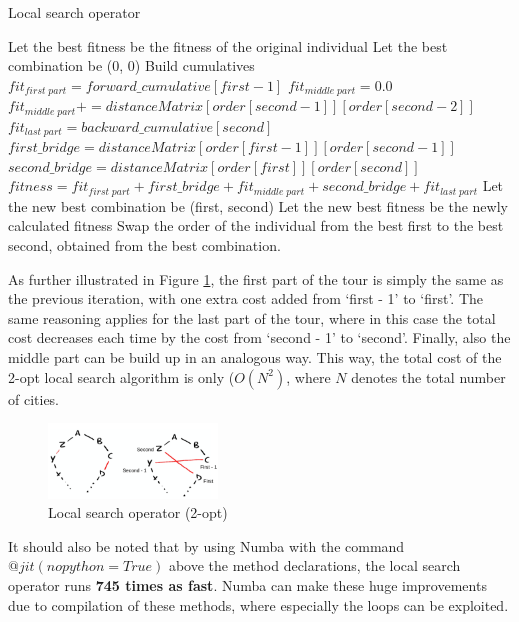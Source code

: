\documentclass[a4paper,10pt]{article}
\begin{document}
\begin{algorithm}
\caption{Local search operator}\label{local_search_operator_algorithm}
\begin{algorithmic}
\State Let the best fitness be the fitness of the original individual
\State Let the best combination be (0, 0)
\State Build cumulatives
\State $fit_{first \; part} = forward\_cumulative[first - 1]$
\State $fit_{middle \; part} = 0.0$
\State $fit_{middle \; part} \mathrel{{+}{=}} distanceMatrix[order[second-1]][order[second-2]]$
\State $fit_{last \; part} = backward\_cumulative[second]$
\State $first\_bridge = distanceMatrix[order[first-1]][order[second-1]]$
\State $second\_bridge = distanceMatrix[order[first]][order[second]]$
\State $fitness = fit_{first \; part} + first\_bridge + fit_{middle \; part} + second\_bridge + fit_{last \; part}$
\State Let the new best combination be (first, second)
\State Let the new best fitness be the newly calculated fitness
\EndIf
\EndFor
\EndFor
\State Swap the order of the individual from the best first to the best second, obtained from the best combination.
\end{algorithmic}
\end{algorithm}

As further illustrated in Figure \ref{local_search_operator_2_opt}, the first part of the tour is simply the same as the previous iteration, with one extra cost added from `first - 1' to `first'. The same reasoning applies for the last part of the tour, where in this case the total cost decreases each time by the cost from `second - 1' to `second'. Finally, also the middle part can be build up in an analogous way. This way, the total cost of the 2-opt local search algorithm is only ($O(N^2)$, where $N$ denotes the total number of cities. 

\begin{figure}[H]
\caption{Local search operator (2-opt) \cite{local_search_slides}}
\label{local_search_operator_2_opt}
\centering
\includegraphics[width=0.4\textwidth]{local_search_operator_2_opt.png}
\end{figure}

It should also be noted that by using Numba with the command $@jit(nopython=True)$ above the method declarations, the local search operator runs \textbf{745 times as fast}. Numba can make these huge improvements due to compilation of these methods, where especially the loops can be exploited.
\end{document}
